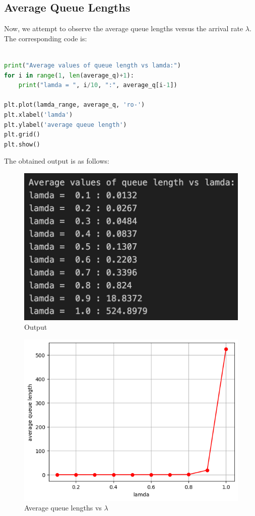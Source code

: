 \documentclass[11pt, a4paper]{article}
\begin{document}
\subsection{Average Queue Lengths}
Now, we attempt to observe the average queue lengths versus the arrival rate $\lambda$. 
The corresponding code is:
\\
\begin{lstlisting}[language = Python]

print("Average values of queue length vs lamda:")
for i in range(1, len(average_q)+1):
    print("lamda = ", i/10, ":", average_q[i-1])

plt.plot(lamda_range, average_q, 'ro-')
plt.xlabel('lamda')
plt.ylabel('average queue length')
plt.grid()
plt.show()

\end{lstlisting}
The obtained output is as follows:
\begin{figure}[H]
     \centering
     \includegraphics[scale=0.3]{Figure_4.png}
     \caption{Output}
\end{figure}

\begin{figure}[H]
     \centering
     \includegraphics[scale=0.6]{Figure_2.png}
     \caption{Average queue lengths vs $\lambda$}
\end{figure}
\end{document}
